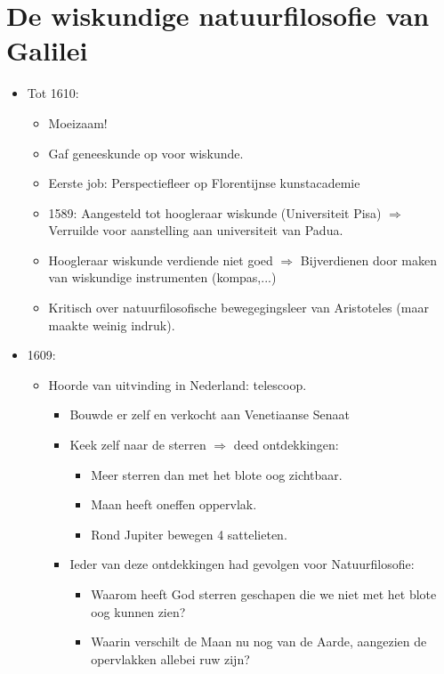 \documentclass{article}
\begin{document}
  \section{De wiskundige natuurfilosofie van Galilei}
    \begin{itemize}
      \item Tot 1610:
      \begin{itemize}
        \item Moeizaam!
        \item Gaf geneeskunde op voor wiskunde.
        \item Eerste job: Perspectiefleer op Florentijnse kunstacademie
        \item 1589: Aangesteld tot hoogleraar wiskunde (Universiteit Pisa) $\Rightarrow$ Verruilde voor aanstelling aan universiteit van Padua.
        \item Hoogleraar wiskunde verdiende niet goed $\Rightarrow$ Bijverdienen door maken van wiskundige instrumenten (kompas,...)
        \item Kritisch over natuurfilosofische bewegegingsleer van Aristoteles (maar maakte weinig indruk).
      \end{itemize}
      \item 1609:
      \begin{itemize}
        \item Hoorde van uitvinding in Nederland: telescoop.
        \begin{itemize}
          \item Bouwde er zelf en verkocht aan Venetiaanse Senaat
          \item Keek zelf naar de sterren $\Rightarrow$ deed ontdekkingen:
          \begin{itemize}
            \item Meer sterren dan met het blote oog zichtbaar.
            \item Maan heeft oneffen oppervlak.
            \item Rond Jupiter bewegen 4 sattelieten.
          \end{itemize}
          \item Ieder van deze ontdekkingen had gevolgen voor Natuurfilosofie:
          \begin{itemize}
            \item Waarom heeft God sterren geschapen die we niet met het blote oog kunnen zien?
            \item Waarin verschilt de Maan nu nog van de Aarde, aangezien de opervlakken allebei ruw zijn?

\end{itemize}
\end{itemize}
\end{itemize}
\end{itemize}
\end{document}
